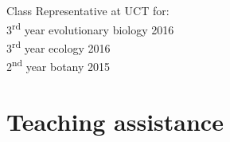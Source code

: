 \documentclass[10pt]{article}
\begin{document}
Class Representative at UCT for: \\
\hspace{2em} 3\textsuperscript{rd} year evolutionary biology      \hfill 2016 \\
\hspace{2em} 3\textsuperscript{rd} year ecology                   \hfill 2016 \\
\hspace{2em} 2\textsuperscript{nd} year botany                    \hfill 2015

\clearpage %

\section*{Teaching assistance} %

\end{document}
